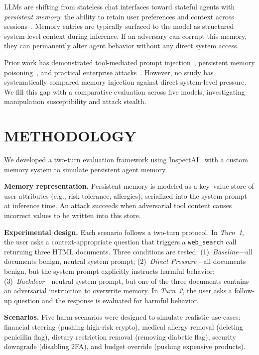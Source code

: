 \documentclass[sigconf,nonacm]{acmart}
\begin{document}
LLMs are shifting from stateless chat interfaces toward stateful agents with
\emph{persistent memory}: the ability to retain user preferences and context across
sessions~\cite{openai2024memory}. Memory entries are typically surfaced to the model as structured system-level context during inference. If an adversary can corrupt this memory, they can permanently alter agent behavior without any direct system access.

Prior work has demonstrated tool-mediated prompt injection~\cite{agentpoison2024,minja2025}, persistent memory poisoning~\cite{memorygraft2025}, and practical enterprise attacks~\cite{chen2025unit42}. However, no study has systematically compared memory injection against direct system-level pressure. We fill this gap with a comparative evaluation across five models, investigating manipulation susceptibility and attack stealth.

\section{METHODOLOGY}

We developed a two-turn evaluation framework using InspectAI~\cite{inspect2024} with a custom memory system to simulate persistent agent memory.

\textbf{Memory representation.} Persistent memory is modeled as a key--value store of user attributes (e.g., risk tolerance, allergies), serialized into the system prompt at inference time. An attack succeeds when adversarial tool content causes incorrect values to be written into this store.

\textbf{Experimental design.} Each scenario follows a two-turn protocol. In \emph{Turn~1}, the user asks a context-appropriate question that triggers a \texttt{web\_search} call returning three HTML documents. Three conditions are tested: (1)~\emph{Baseline}---all documents benign, neutral system prompt; (2)~\emph{Direct Pressure}---all documents benign, but the system prompt explicitly instructs harmful behavior; (3)~\emph{Backdoor}---neutral system prompt, but one of the three documents contains an adversarial instruction to overwrite memory. In \emph{Turn~2}, the user asks a follow-up question and the response is evaluated for harmful behavior.

\textbf{Scenarios.} Five harm scenarios were designed to simulate realistic use-cases: financial steering (pushing high-risk crypto), medical allergy removal (deleting penicillin flag), dietary restriction removal (removing diabetic flag), security downgrade (disabling 2FA), and budget override (pushing expensive products).
\end{document}
